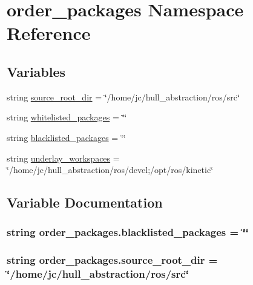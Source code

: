 \hypertarget{namespaceorder__packages}{}\section{order\+\_\+packages Namespace Reference}
\label{namespaceorder__packages}
\subsection*{Variables}
\begin{DoxyCompactItemize}
\item 
string \hyperlink{namespaceorder__packages_aff4fd297841de7fbddc2c0c33a6bab21}{source\+\_\+root\+\_\+dir} = \char`\"{}/home/jc/hull\+\_\+abstraction/ros/src\char`\"{}
\item 
string \hyperlink{namespaceorder__packages_a84450a73e77dbf3689293b97dcb697a4}{whitelisted\+\_\+packages} = \char`\"{}\char`\"{}
\item 
string \hyperlink{namespaceorder__packages_a29ea913f00c5a0e81d3c7688e7375507}{blacklisted\+\_\+packages} = \char`\"{}\char`\"{}
\item 
string \hyperlink{namespaceorder__packages_a11d102ff09fd2977b9075c4c722015d2}{underlay\+\_\+workspaces} = \char`\"{}/home/jc/hull\+\_\+abstraction/ros/devel;/opt/ros/kinetic\char`\"{}
\end{DoxyCompactItemize}


\subsection{Variable Documentation}
\subsubsection[{\texorpdfstring{blacklisted\+\_\+packages}{blacklisted_packages}}]{\setlength{\rightskip}{0pt plus 5cm}string order\+\_\+packages.\+blacklisted\+\_\+packages = \char`\"{}\char`\"{}}\hypertarget{namespaceorder__packages_a29ea913f00c5a0e81d3c7688e7375507}{}\label{namespaceorder__packages_a29ea913f00c5a0e81d3c7688e7375507}
\subsubsection[{\texorpdfstring{source\+\_\+root\+\_\+dir}{source_root_dir}}]{\setlength{\rightskip}{0pt plus 5cm}string order\+\_\+packages.\+source\+\_\+root\+\_\+dir = \char`\"{}/home/jc/hull\+\_\+abstraction/ros/src\char`\"{}}\hypertarget{namespaceorder__packages_aff4fd297841de7fbddc2c0c33a6bab21}{}\label{namespaceorder__packages_aff4fd297841de7fbddc2c0c33a6bab21}
